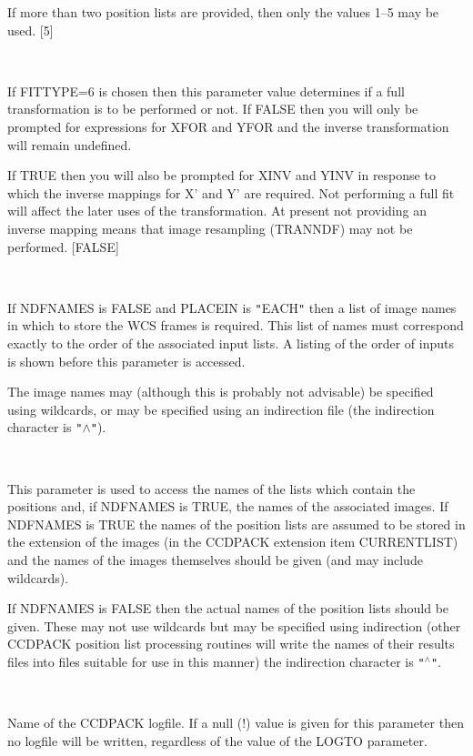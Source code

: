 \documentclass[twoside,11pt]{article}
\newcommand{\htmlref}[2]{#1}
\renewcommand{\_}{\texttt{\symbol{95}}}
\newcommand{\qt}[1]{{\tt "}#1{\tt "}}
\newcommand{\xroutine}[1]{\htmlref{{\sc #1}}{#1}}
\newcommand{\sstsubsection}[1]{ \item[{#1}] \mbox{} \\}
\newcommand{\sstsubsection}[1]{\item[{#1}]}
\begin{document}
{{{{         }
         If more than two position lists are provided, then only the 
         values 1--5 may be used. 
         [5]
      }
      \sstsubsection{
         FULL = \_LOGICAL (Read)
      } {
         If FITTYPE=6 is chosen then this parameter value determines
         if a full transformation is to be performed or not. If FALSE
         then you will only be prompted for expressions for XFOR and
         YFOR and the inverse transformation will remain undefined.

         If TRUE then you will also be prompted for XINV and YINV in
         response to which the inverse mappings for X' and Y' are
         required. Not performing a full fit will affect the later
         uses of the transformation. At present not providing an inverse
         mapping means that image resampling (\xroutine{TRANNDF}) may not be
         performed.
         [FALSE]
      }
      \sstsubsection{
         IN = LITERAL (Read)
      } {
         If NDFNAMES is FALSE and PLACEIN is \qt{EACH} then a list of image
         names in which to store the WCS frames is required.  This
         list of names must correspond  exactly to the order of the
         associated input lists. A listing of the order of inputs is
         shown before this parameter is accessed.

         The image names may (although this is probably not advisable)
         be specified using wildcards, or may be specified using an
         indirection file (the indirection character is {\tt "}$\wedge${\tt "}).
      }
      \sstsubsection{
         INLIST = LITERAL (Read)
      } {
         This parameter is used to access the names of the lists
         which contain the positions and, if NDFNAMES is TRUE, the names
         of the associated images. If NDFNAMES is TRUE the names of the
         position lists are assumed to be stored in the extension of the
         images (in the CCDPACK extension item CURRENT\_LIST) and the names
         of the images themselves should be given (and may include
         wildcards).

         If NDFNAMES is FALSE then the actual names of the position
         lists should be given. These may not use wildcards but may be
         specified using indirection (other CCDPACK position list
         processing routines will write the names of their results
         files into files suitable for use in this manner) the
         indirection character is \qt{$^\wedge$}.
      }
      \sstsubsection{
         LOGFILE = FILENAME (Read)
      } {
         Name of the CCDPACK logfile.  If a null (!) value is given for
         this parameter then no logfile will be written, regardless of
         the value of the LOGTO parameter.

}}}
\end{document}
